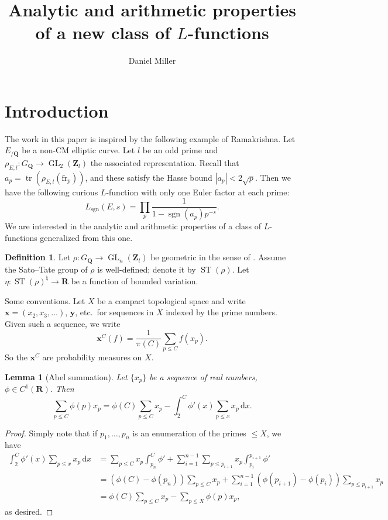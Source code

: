 \documentclass{article}
\title{Analytic and arithmetic properties of a new class of \texorpdfstring{$L$}{L}-functions}
\author{Daniel Miller}
\DeclareMathOperator{\GL}{GL}
\DeclareMathOperator{\sgn}{sgn}
\DeclareMathOperator{\ST}{ST}
\DeclareMathOperator{\tr}{tr}
\newcommand{\bQ}{\mathbf{Q}}
\newcommand{\bR}{\mathbf{R}}
\newcommand{\bx}{\boldsymbol{x}}
\newcommand{\by}{\boldsymbol{y}}
\newcommand{\bZ}{\mathbf{Z}}
\newcommand{\dd}{\mathrm{d}}
\newcommand{\frob}{\mathrm{fr}}
\newtheorem{lemma}[theorem]{Lemma}
\theoremstyle{definition}
\newtheorem{definition}[theorem]{Definition}
\numberwithin{theorem}{section}
\begin{document}
\maketitle





\section{Introduction}

The work in this paper is inspired by the following example of Ramakrishna. Let 
$E_{/\bQ}$ be a non-CM elliptic curve. Let $l$ be an odd prime and 
$\rho_{E,l}\colon G_\bQ \to \GL_2(\bZ_l)$ the associated representation. Recall 
that $a_p = \tr(\rho_{E,l}(\frob_p))$, and these satisfy the Hasse bound 
$|a_p|<2\sqrt p$. Then we have the following curious $L$-function with only one 
Euler factor at each prime: 
\[
	L_{\sgn}(E,s) = \prod_p \frac{1}{1-\sgn(a_p) p^{-s}} .
\]
We are interested in the analytic and arithmetic properties of a class of 
$L$-functions generalized from this one. 

\begin{definition}
Let $\rho\colon G_\bQ \to \GL_n(\bZ_l)$ be geometric in the sense of 
\cite{fontain-mazur-1995}. Assume the Sato--Tate group of $\rho$ is 
well-defined; denote it by $\ST(\rho)$. Let 
$\eta\colon \ST(\rho)^\natural \to \bR$ be a function of bounded variation.  
\end{definition}

Some conventions. Let $X$ be a compact topological space and 
write $\bx = (x_2,x_3,\dots)$, $\by$, etc.~for sequences in $X$ 
indexed by the prime numbers. Given such a sequence, we write 
\[
	\bx^C(f) = \frac{1}{\pi(C)}\sum_{p\leqslant C} f(x_p) .
\]
So the $\bx^C$ are probability measures on $X$. 





\begin{lemma}[Abel summation]
Let $\{x_p\}$ be a sequence of real numbers, $\phi\in C^1(\bR)$. Then 
\[
	\sum_{p\leqslant C} \phi(p) x_p = \phi(C) \sum_{p\leqslant C} x_p - \int_2^C \phi'(x) \sum_{p\leqslant x} x_p\, \dd x .
\]
\end{lemma}
\begin{proof}
Simply note that if $p_1,\dots,p_n$ is an enumeration of the primes 
$\leqslant X$, we have 
\begin{align*}
	\int_2^C \phi'(x) \sum_{p\leqslant x} x_p\, \dd x 
		&= \sum_{p\leqslant C} x_p\int_{p_n}^C \phi' + \sum_{i=1}^{n-1} \sum_{p\leqslant p_{i+1}}x_p\int_{p_i}^{p_{i+1}} \phi' \\
		&= (\phi(C)-\phi(p_n))\sum_{p\leqslant C} x_p + \sum_{i=1}^{n-1} (\phi(p_{i+1})-\phi(p_i)) \sum_{p\leqslant p_{i+1}} x_p \\
		&= \phi(C) \sum_{p\leqslant C} x_p - \sum_{p\leqslant X} \phi(p) x_p ,
\end{align*}
as desired.
\end{proof}
\end{document}
